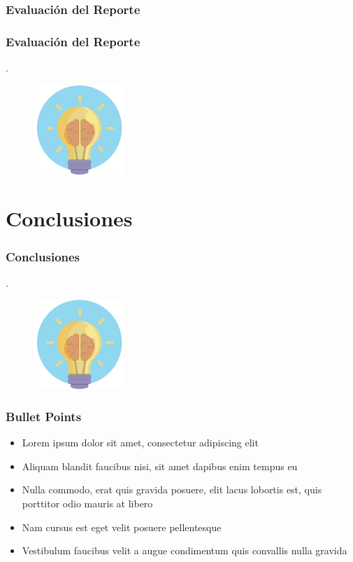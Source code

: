 \documentclass{beamer}
\begin{document}
\subsubsection{Evaluación del Reporte} %
\begin{frame}
    \frametitle{Evaluación del Reporte}
    .
	\begin{figure}
		\begin{center}
			\includegraphics[scale=0.45]{images/2icons/need.png}
			\label{student}
		\end{center}
	\end{figure}
\end{frame}
\section{Conclusiones} %
\begin{frame}
    \frametitle{Conclusiones}
    .
	\begin{figure}
		\begin{center}
			\includegraphics[scale=0.45]{images/2icons/need.png}
			\label{student}
		\end{center}
	\end{figure}
\end{frame}

\begin{frame}
\frametitle{Bullet Points}
\begin{itemize}
\item Lorem ipsum dolor sit amet, consectetur adipiscing elit
\item Aliquam blandit faucibus nisi, sit amet dapibus enim tempus eu
\item Nulla commodo, erat quis gravida posuere, elit lacus lobortis est, quis porttitor odio mauris at libero
\item Nam cursus est eget velit posuere pellentesque
\item Vestibulum faucibus velit a augue condimentum quis convallis nulla gravida
\end{itemize}
\end{frame}
\end{document}
